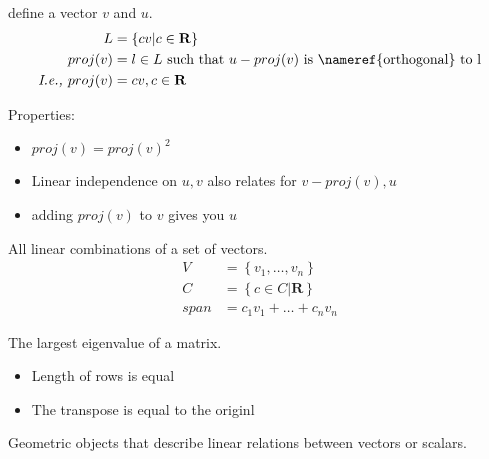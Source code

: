 \begin{definition}[Projection]
    define a vector $v$ and $u$.
    \begin{align*}
        L &= \left\{cv | c \in \mathbf{R} \right\}  \\
        proj(v) &= l \in L \text{\ such that\ } u - proj(v) 
        \text{\ is~\nameref{orthogonal} to l}  \\
        \textit{I.e., } proj(v) &= cv, c \in \mathbf{R}
    \end{align*}

    Properties:
    \begin{itemize}
        \item $proj(v) = proj(v)^{2}$
        \item Linear independence on $u, v$ also relates for $v - proj(v), u$
        \item adding $proj(v)$ to $v$ gives you $u$
    \end{itemize}

\end{definition}

\begin{definition}\label{vectorspan}
    All linear combinations of a set of vectors.
    \begin{align*}
        V &= \left\{v_{1}, \dots, v_n\right\} \\
        C &= \left\{c \in C | \mathbf{R}\right\} \\
        span &= c_{1}v_{1} + \dots + c_{n}v_{n}
    \end{align*}
\end{definition}

\begin{definition}
    The largest eigenvalue of a matrix.
\end{definition}

\begin{definition}[Symmetric]
    \begin{itemize}
        \item Length of rows is equal
        \item The transpose is equal to the originl
    \end{itemize}
\end{definition}

\begin{definition}[Tensor]
    Geometric objects that describe linear relations between vectors or scalars.
\end{definition}

